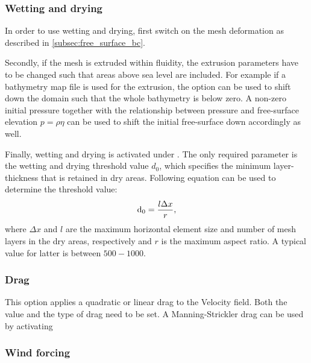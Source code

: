 \subsubsection{Wetting and drying}\label{subsec:wetting_drying_bc}

In order to use wetting and drying, first switch on the mesh deformation as described in \ref{subsec:free_surface_bc}.

Secondly, if the mesh is extruded within fluidity, the extrusion parameters have to be changed such that areas above sea level are included.
For example if a bathymetry map file is used for the extrusion, the option 
can be used to shift down the domain such that the whole bathymetry is below zero.
A non-zero initial pressure together with the relationship between pressure and free-surface elevation $p = \rho \eta$ can be used to shift the initial free-surface down accordingly as well.

Finally, wetting and drying is activated under .
The only required parameter is the wetting and drying threshold value $d_0$, which specifies the minimum layer-thickness that is retained in dry areas. 
Following equation can be used to determine the threshold value:
\begin{equation*}
\mathrm{d}_0 = \frac{l\Delta x}{r},
\end{equation*}
where $\Delta x$ and $l$ are the maximum horizontal element size and number of mesh layers in the dry areas, respectively and $r$ is the maximum aspect ratio. A typical value for latter is between $500-1000$.


\subsubsection{Drag}

This option applies a quadratic or linear drag to the Velocity field. Both the value and the type of drag need to be set. A Manning-Strickler drag can be used by activating 

\subsubsection{Wind forcing}\label{sec:wind_forcing}

